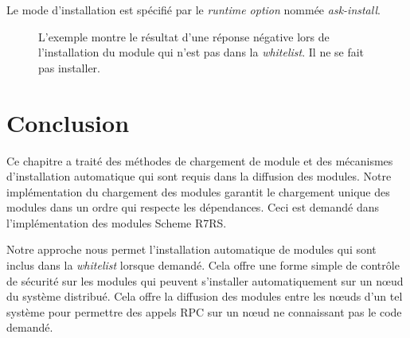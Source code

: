 Le mode d'installation est spécifié par le \textit{runtime option} nommée
\textit{ask-install}.
\begin{figure}[h]
  \caption{L'exemple montre le résultat d'une réponse négative lors de
    l'installation du module qui n'est pas dans la \textit{whitelist}.
    Il ne se fait pas installer.}
\end{figure}


\section{Conclusion}

Ce chapitre a traité des méthodes de chargement de module et des mécanismes
d'installation automatique qui sont requis dans la diffusion des modules.
Notre implémentation du chargement des modules garantit le chargement unique
des modules dans un ordre qui respecte les dépendances. Ceci est demandé dans
l'implémentation des modules Scheme R7RS.

Notre approche nous permet l'installation automatique de modules qui sont
inclus dans la \textit{whitelist} lorsque demandé.  Cela offre une forme simple
de contrôle de sécurité sur les modules qui peuvent s'installer automatiquement
sur un nœud du système distribué. Cela offre la diffusion des modules entre les
nœuds d'un tel système pour permettre des appels RPC sur un nœud ne connaissant
pas le code demandé.








